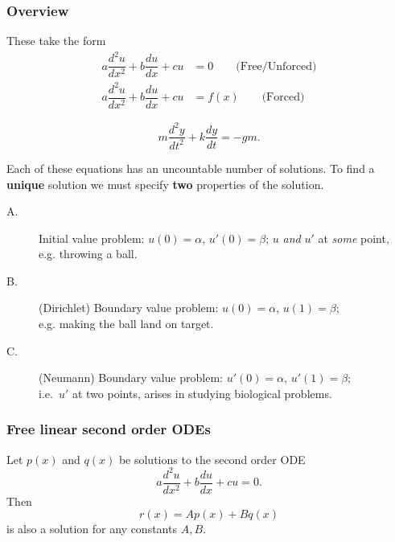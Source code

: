 \subsubsection*{Overview}

These take the form
\begin{align*}
a \dfrac{d^2 u}{dx^2} + b \dfrac{du}{dx} + cu & =  0 \qquad
\text{(Free/Unforced)} \\
a \dfrac{d^2 u}{dx^2} + b \dfrac{du}{dx} + cu & =  f(x) \qquad
\text{(Forced)}
\end{align*}

\begin{example}
\[
m\frac{d^2 y}{dt^2} + k\frac{dy}{dt}  =  -gm.
\]
\end{example}

Each of these equations has an uncountable number of solutions. To
find a \textbf{unique} solution we must specify \textbf{two}
properties of the solution.

\begin{description}
\item[A.] Initial value problem: $u(0) = \alpha$, \quad $u'(0)=\beta$;
$u$ \emph{and} $u'$ at \emph{some} point, 
\\e.g. throwing a ball.

\item[B.] (Dirichlet) Boundary value problem: $u(0) = \alpha$, \quad $u(1)=\beta$;
\\ e.g. making the ball land on target.

\item[C.] (Neumann) Boundary value problem: $u'(0) = \alpha$, \quad
$u'(1)=\beta$;
\\i.e.\ $u'$ at two points, arises in studying biological problems. 

\end{description}


\subsubsection*{Free linear second order ODEs}

\begin{theorem}[Superposition] \label{thm:superposition}
 Let $p(x)$ and $q(x)$ be solutions to the second order ODE
 \[
  a \dfrac{d^2 u}{dx^2} + b \dfrac{du}{dx} + cu  =  0.
 \]
Then
\[
r(x)  =  A p(x) + B q(x)
\]
is also a solution for any constants $A,B$.
\end{theorem}

